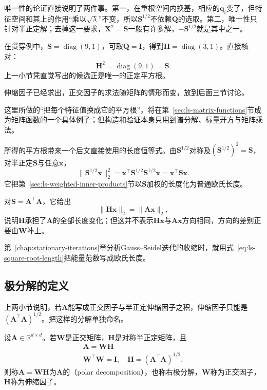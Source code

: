 唯一性的论证直接说明了两件事。第一，在重根空间内换基，相应的$\bm q_i$变了，但特征空间和其上的作用“乘以$\sqrt\lambda$”不变，所以$\bm S^{1/2}$不依赖$\bm Q$的选取。第二，唯一性只针对半正定解；去掉这一要求，$\bm X^2=\bm S$一般有许多解，$-\bm S^{1/2}$就是其中之一。

在贯穿例中，$\bm S=\operatorname{diag}(9,1)$，可取$\bm Q=\bm I$，得到$\bm H=\operatorname{diag}(3,1)$。直接核对：
\[
 \bm H^2=\operatorname{diag}(9,1)=\bm S .
\]
上一小节凭直觉写出的候选正是唯一的正定平方根。

伸缩因子已经求出，正交因子的求法随矩阵的情形而变，放到后面三节讨论。

这里所做的“把每个特征值换成它的平方根”，将在第~\ref{sec:ls-matrix-functions}节成为矩阵函数的一个具体例子；但构造和验证本身只用到谱分解、标量开方与矩阵乘法。

所得的平方根带来一个后文直接使用的长度恒等式。由$\bm S^{1/2}$对称及$(\bm S^{1/2})^2=\bm S$，对半正定$\bm S$与任意$\bm x$，
\begin{equation}
 \lVert\bm S^{1/2}\bm x\rVert_2^2
 =\bm x^\top\bm S^{1/2}\bm S^{1/2}\bm x
 =\bm x^\top\bm S\bm x .
 \label{eq:ls-square-root-length}
\end{equation}
它把第~\ref{sec:ls-weighted-inner-products}节以$\bm S$加权的长度化为普通欧氏长度。

对$\bm S=\bm A^\top\bm A$，它给出
\[
 \lVert\bm H\bm x\rVert_2=\lVert\bm A\bm x\rVert_2 ,
\]
说明$\bm H$承担了$\bm A$的全部长度变化；但这并不表示$\bm H\bm x$与$\bm A\bm x$方向相同，方向的差别正要由$\bm W$补上。

第~\ref{chap:stationary-iterations}章分析Gauss--Seidel迭代的收缩时，就用式~\eqref{eq:ls-square-root-length}把能量范数写成欧氏长度。

\subsection{极分解的定义}
\label{sec:ls-polar-definition}

上两小节说明，若$\bm A$能写成正交因子与半正定伸缩因子之积，伸缩因子只能是$(\bm A^\top\bm A)^{1/2}$。把这样的分解单独命名。
\begin{definition}[极分解]
\label{def:matrix-analysis-polar-decomposition}
设$\bm A\in\mathbb R^{d\times d}$。若$\bm W$是正交矩阵，$\bm H$是对称半正定矩阵，且
\begin{equation}
\begin{gathered}
 \bm A=\bm W\bm H\\
 \bm W^\top\bm W=\bm I,\quad \bm H=(\bm A^\top\bm A)^{1/2},
\end{gathered}
\label{eq:matrix-analysis-polar-decomposition}
\end{equation}
则称$\bm A=\bm W\bm H$为$\bm A$的（polar decomposition），也称右极分解，$\bm W$称为正交因子，$\bm H$称为伸缩因子。
\end{definition}

